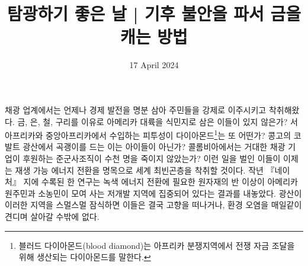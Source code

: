 \documentclass{translation}
\date{17 April 2024}
\title{탐광하기 좋은 날 | 기후 불안을 파서 금을 캐는 방법}
\begin{document}
채광 업계에서는 언제나 경제 발전을 명분 삼아 주민들을 강제로 이주시키고 착취해왔다.
금, 은, 철, 구리를 이유로 아메리카 대륙을 식민지로 삼은 이들이 있지 않은가?
서아프리카와 중앙아프리카에서 수입하는 피투성이 다이아몬드\footnote{블러드 다이아몬드(blood diamond)는 아프리카 분쟁지역에서 전쟁 자금 조달을 위해 생산되는 다이아몬드를 말한다.}는 또 어떤가?
콩고의 코발트 광산에서 곡괭이를 드는 이는 아이들이 아닌가?
콜롬비아에서는 거대한 채광 기업이 후원하는 준군사조직이 수천 명을 죽이지 않았는가?
이런 일을 벌인 이들이 이제는 재생 가능 에너지 전환을 명목으로 세계 최빈곤층을 착취할 것이다.
작년 『네이처』 지에 수록된 한 연구는 녹색 에너지 전환에 필요한 원자재의 반 이상이 아메리카 원주민과 소농민이 모여 사는 저개발 지역에 집중되어 있다는 결과를 내놓았다.
광산이 이러한 지역을 스멀스멀 잠식하면 이들은 결국 고향을 떠나거나, 환경 오염을 매일같이 견디며 살아갈 수밖에 없다.
%
\end{document}
